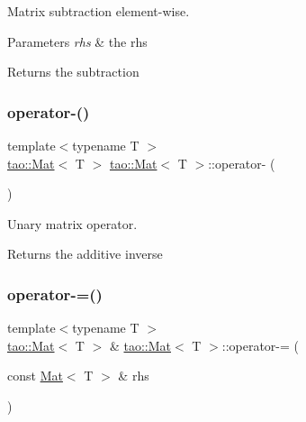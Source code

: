 Matrix subtraction element-\/wise. 


\begin{DoxyParams}{Parameters}
{\em rhs} & the rhs \\
\hline
\end{DoxyParams}
\begin{DoxyReturn}{Returns}
the subtraction 
\end{DoxyReturn}
\mbox{\label{classtao_1_1_mat_a5da0629614bcc00ae6d850a3107e4192}} 
\subsubsection{\texorpdfstring{operator-\/()}{operator-()}\hspace{0.1cm}{\footnotesize\ttfamily [2/2]}}
{\footnotesize\ttfamily template$<$typename T $>$ \\
\mbox{\hyperlink{classtao_1_1_mat}{tao\+::\+Mat}}$<$ T $>$ \mbox{\hyperlink{classtao_1_1_mat}{tao\+::\+Mat}}$<$ T $>$\+::operator-\/ (\begin{DoxyParamCaption}{ }\end{DoxyParamCaption})}



Unary matrix operator. 

\begin{DoxyReturn}{Returns}
the additive inverse 
\end{DoxyReturn}
\mbox{\label{classtao_1_1_mat_ac7109400de3729992a23e6d8ea5857b6}} 
\subsubsection{\texorpdfstring{operator-\/=()}{operator-=()}}
{\footnotesize\ttfamily template$<$typename T $>$ \\
\mbox{\hyperlink{classtao_1_1_mat}{tao\+::\+Mat}}$<$ T $>$ \& \mbox{\hyperlink{classtao_1_1_mat}{tao\+::\+Mat}}$<$ T $>$\+::operator-\/= (\begin{DoxyParamCaption}\item[{const \mbox{\hyperlink{classtao_1_1_mat}{Mat}}$<$ T $>$ \&}]{rhs }\end{DoxyParamCaption})}



